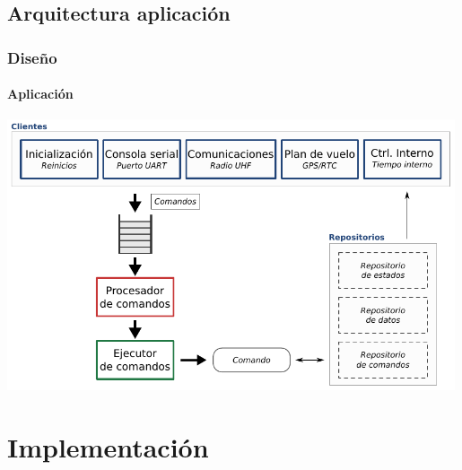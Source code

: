 \documentclass[xcolor=dvipsnames]{beamer}
\begin{document}
    \subsection{Arquitectura aplicación}
    \begin{frame}
        \frametitle{Diseño}
        \framesubtitle{Aplicación}
        
        \centering
        \includegraphics[width=0.99\textwidth]{img/arquitectura_suchai.pdf}
        
    \end{frame}
    
    \section{Implementación}
\end{document}
